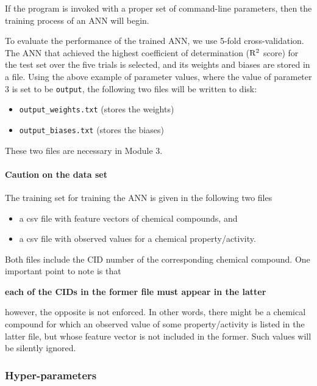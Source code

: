 \documentclass[11pt, titlepage, dvipdfmx, twoside]{article}
\begin{document}
If the program is invoked with a proper set of command-line parameters,
then the training process of an ANN will begin.

To evaluate the performance of the trained ANN,
we use 5-fold cross-validation.
The ANN that achieved the highest coefficient of determination 
(${\rm R}^2$ score) for the test set over the five trials
is selected, and its weights and biases are stored
in a file.
Using the above example of parameter values,
where the value of parameter 3 is set to be \verb|output|,
the following two files will be written to disk:
\begin{itemize}
\item \verb|output_weights.txt| (stores the weights)
\item \verb|output_biases.txt| (stores the biases)
\end{itemize}
These two files are necessary in Module 3.


\paragraph{Caution on the data set}
The training set for training the ANN is given 
in the following two files
%
\begin{itemize}
\item a csv file with feature vectors of chemical compounds, and 
\item a csv file with observed values for a chemical property/activity.
\end{itemize}
Both files include the CID number of the corresponding chemical compound.
One important point to note is that
%
\begin{center}
  {\bf each of the CIDs in the former file must appear in the latter }
\end{center}
%
however, the opposite is not enforced.
In other words, there might be a chemical compound
for which an observed value of some property/activity
is listed in the latter file, but whose
feature vector is not included in the former.
Such values will be silently ignored.


\subsubsection{Hyper-parameters}
\end{document}
